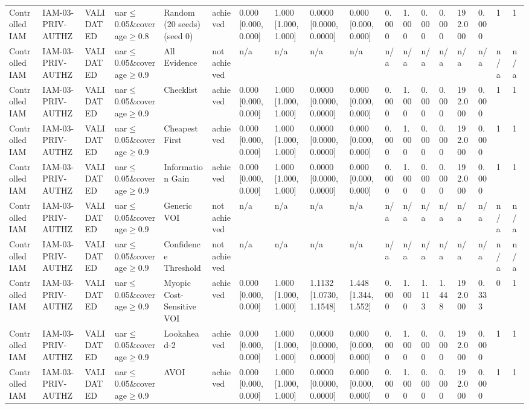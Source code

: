 \begin{table}[!ht]
{\begin{tabular}{llllllllllllllllll}
Controlled IAM & IAM-03-PRIV-AUTHZ & VALIDATED & uar$\le$0.05\&coverage$\ge$0.8 & Random (20 seeds) (seed 0) & achieved & 0.000 [0.000, 0.000] & 1.000 [1.000, 1.000] & 0.0000 [0.0000, 0.0000] & 0.000 [0.000, 0.000] & 0.000 & 1.000 & 0.000 & 0.000 & 192.000 & 0.000 & 1 & 1 \\
Controlled IAM & IAM-03-PRIV-AUTHZ & VALIDATED & uar$\le$0.05\&coverage$\ge$0.9 & All Evidence & not achieved & n/a & n/a & n/a & n/a & n/a & n/a & n/a & n/a & n/a & n/a & n/a & n/a \\
Controlled IAM & IAM-03-PRIV-AUTHZ & VALIDATED & uar$\le$0.05\&coverage$\ge$0.9 & Checklist & achieved & 0.000 [0.000, 0.000] & 1.000 [1.000, 1.000] & 0.0000 [0.0000, 0.0000] & 0.000 [0.000, 0.000] & 0.000 & 1.000 & 0.000 & 0.000 & 192.000 & 0.000 & 1 & 1 \\
Controlled IAM & IAM-03-PRIV-AUTHZ & VALIDATED & uar$\le$0.05\&coverage$\ge$0.9 & Cheapest First & achieved & 0.000 [0.000, 0.000] & 1.000 [1.000, 1.000] & 0.0000 [0.0000, 0.0000] & 0.000 [0.000, 0.000] & 0.000 & 1.000 & 0.000 & 0.000 & 192.000 & 0.000 & 1 & 1 \\
Controlled IAM & IAM-03-PRIV-AUTHZ & VALIDATED & uar$\le$0.05\&coverage$\ge$0.9 & Information Gain & achieved & 0.000 [0.000, 0.000] & 1.000 [1.000, 1.000] & 0.0000 [0.0000, 0.0000] & 0.000 [0.000, 0.000] & 0.000 & 1.000 & 0.000 & 0.000 & 192.000 & 0.000 & 1 & 1 \\
Controlled IAM & IAM-03-PRIV-AUTHZ & VALIDATED & uar$\le$0.05\&coverage$\ge$0.9 & Generic VOI & not achieved & n/a & n/a & n/a & n/a & n/a & n/a & n/a & n/a & n/a & n/a & n/a & n/a \\
Controlled IAM & IAM-03-PRIV-AUTHZ & VALIDATED & uar$\le$0.05\&coverage$\ge$0.9 & Confidence Threshold & not achieved & n/a & n/a & n/a & n/a & n/a & n/a & n/a & n/a & n/a & n/a & n/a & n/a \\
Controlled IAM & IAM-03-PRIV-AUTHZ & VALIDATED & uar$\le$0.05\&coverage$\ge$0.9 & Myopic Cost-Sensitive VOI & achieved & 0.000 [0.000, 0.000] & 1.000 [1.000, 1.000] & 1.1132 [1.0730, 1.1548] & 1.448 [1.344, 1.552] & 0.000 & 1.000 & 1.113 & 1.448 & 192.000 & 0.333 & 0 & 1 \\
Controlled IAM & IAM-03-PRIV-AUTHZ & VALIDATED & uar$\le$0.05\&coverage$\ge$0.9 & Lookahead-2 & achieved & 0.000 [0.000, 0.000] & 1.000 [1.000, 1.000] & 0.0000 [0.0000, 0.0000] & 0.000 [0.000, 0.000] & 0.000 & 1.000 & 0.000 & 0.000 & 192.000 & 0.000 & 1 & 1 \\
Controlled IAM & IAM-03-PRIV-AUTHZ & VALIDATED & uar$\le$0.05\&coverage$\ge$0.9 & AVOI & achieved & 0.000 [0.000, 0.000] & 1.000 [1.000, 1.000] & 0.0000 [0.0000, 0.0000] & 0.000 [0.000, 0.000] & 0.000 & 1.000 & 0.000 & 0.000 & 192.000 & 0.000 & 1 & 1 \\

\end{tabular}}
\end{table}
